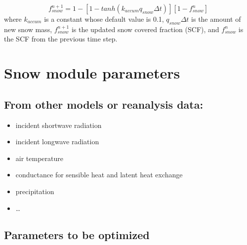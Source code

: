 \documentclass[twoside,10pt]{report}
\begin{document}
\begin{equation}
f_{snow}^{n+1} = 1-[1-tanh(k_{accum}q_{snow}\Delta t)][1-f_{snow}^{n}]
\end{equation}
where $k_{accum}$ is a constant whose default value is 0.1, $q_{snow}\Delta t$ is the amount of new snow mass, $f_{snow}^{n+1}$ is the updated snow covered fraction (SCF), and $f_{snow}^{n}$ is the SCF from the previous time step.

\section{Snow module parameters}
\subsection{From other models or reanalysis data:}
\begin{itemize}
    \item incident shortwave radiation
    \item incident longwave radiation
    \item air temperature
    \item conductance for sensible heat and latent heat exchange
    \item precipitation
    \item \ldots
\end{itemize}

\subsection{Parameters to be optimized}
\end{document}
